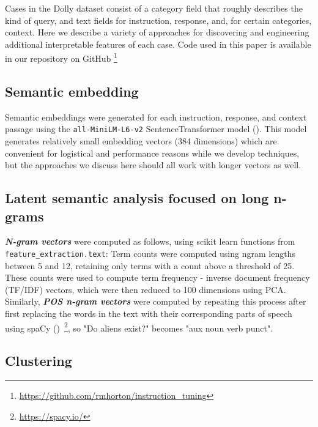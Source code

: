 Cases in the Dolly dataset consist of a category field that roughly describes the kind of query, and text fields for instruction, response, and, for certain categories, context. Here we describe a variety of approaches for discovering and engineering additional interpretable features of each case.
Code used in this paper is available in our repository on GitHub \footnote{\url{https://github.com/rmhorton/instruction_tuning}}

\subsection{Semantic embedding}

Semantic embeddings were generated for each instruction, response, and context passage using the \texttt{all-MiniLM-L6-v2} SentenceTransformer model (\cite{reimers-2019-sentence-bert}). This model generates relatively small embedding vectors (384 dimensions) which are convenient for logistical and performance reasons while we develop techniques, but the approaches we discuss here should all work with longer vectors as well.

\subsection{Latent semantic analysis focused on long n-grams}

\textbf{\emph{N-gram vectors}} were computed as follows, using scikit learn functions from \texttt{feature\_extraction.text}:
Term counts were computed using ngram lengths between 5 and 12, retaining only terms with a count above a threshold of 25. These counts were used to compute term frequency - inverse document frequency (TF/IDF) vectors, which were then reduced to 100 dimensions using PCA. 
Similarly, \textbf{\emph{POS n-gram vectors}} were computed by repeating this process after first replacing the words in the text with their corresponding parts of speech using spaCy (\cite{honnibal2020spacy})~\footnote{\url{https://spacy.io/}}, so "Do aliens exist?" becomes "aux noun verb punct".

\subsection{Clustering}


